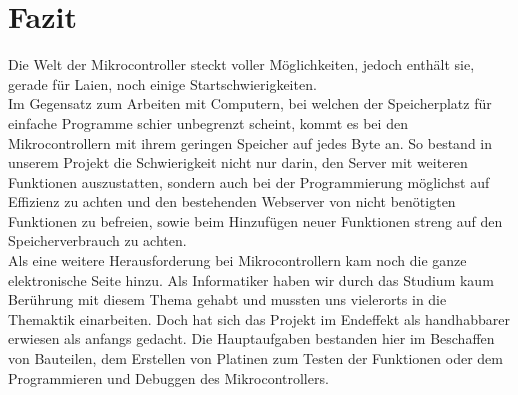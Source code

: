 \chapter{Fazit}

Die Welt der Mikrocontroller steckt voller Möglichkeiten, jedoch enthält sie, gerade 
für Laien, noch einige Startschwierigkeiten.\\
Im Gegensatz zum Arbeiten mit Computern, bei welchen der Speicherplatz für 
einfache Programme schier unbegrenzt scheint, kommt es bei
den Mikrocontrollern mit ihrem geringen Speicher auf jedes Byte an. 
So bestand in unserem Projekt 
die Schwierigkeit nicht nur darin, den Server mit weiteren Funktionen auszustatten, sondern
auch bei der Programmierung möglichst auf Effizienz zu achten und den
bestehenden Webserver von nicht benötigten Funktionen zu befreien, sowie beim Hinzufügen 
neuer Funktionen streng auf den Speicherverbrauch zu achten.\\
Als eine weitere Herausforderung bei Mikrocontrollern kam noch die ganze elektronische
Seite hinzu. Als Informatiker haben wir durch das Studium kaum Berührung mit
diesem Thema gehabt und mussten uns vielerorts in die Themaktik einarbeiten.
Doch hat sich das Projekt im Endeffekt als handhabbarer erwiesen als anfangs gedacht. Die
Hauptaufgaben bestanden hier im Beschaffen von Bauteilen, dem
Erstellen von Platinen zum Testen der Funktionen oder dem Programmieren und
Debuggen des Mikrocontrollers.

